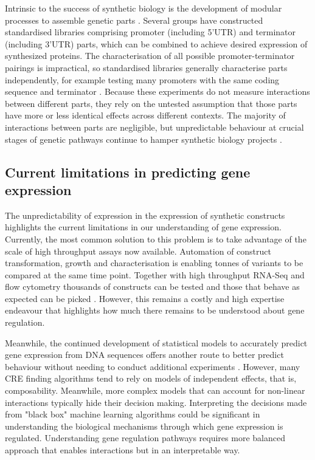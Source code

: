 \documentclass[../main.tex]{subfiles}
\begin{document}
Intrinsic to the success of synthetic biology is the development of modular processes to assemble genetic parts \parencite{Curran2013,Lee2015,Garcia2018,Andreou2018}.
Several groups have constructed standardised libraries comprising promoter (including 5’UTR) and terminator (including 3’UTR) parts, which can be combined to achieve desired expression of synthesized proteins.
The characterisation of all possible promoter-terminator pairings is impractical, so standardised libraries generally characterise parts independently, for example testing many promoters with the same coding sequence and terminator \parencite{Lee2015}.
Because these experiments do not measure interactions between different parts, they rely on the untested assumption that those parts have more or less identical effects across different contexts.
The majority of interactions between parts are negligible, but unpredictable behaviour at crucial stages of genetic pathways continue to hamper synthetic biology projects \parencite{Kittleson2012}.

\subsection{Current limitations in predicting gene expression}

The unpredictability of expression in the expression of synthetic constructs highlights the current limitations in our understanding of gene expression.
Currently, the most common solution to this problem is to take advantage of the scale of high throughput assays now available. 
Automation of construct transformation, growth and characterisation is enabling tonnes of variants to be compared at the same time point. 
Together with high throughput RNA-Seq and flow cytometry thousands of constructs can be tested and those that behave as expected can be picked \parencite{Kosuri2013}. 
However, this remains a costly and high expertise endeavour that highlights how much there remains to be understood about gene regulation. 

Meanwhile, the continued development of statistical models to accurately predict gene expression from DNA sequences offers another route to better predict behaviour without needing to conduct additional experiments \parencite{Li2015}. 
However, many CRE finding algorithms tend to rely on models of independent effects, that is, composability.
Meanwhile, more complex models that can account for non-linear interactions typically hide their decision making. 
Interpreting the decisions made from "black box" machine learning algorithms \parencite{Guidotti2018} could be significant in understanding the biological mechanisms through which gene expression is regulated. 
Understanding gene regulation pathways requires more balanced approach that enables interactions but in an interpretable way. 
\end{document}
